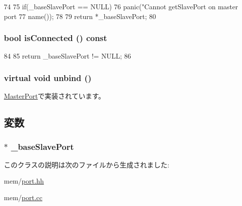\begin{DoxyCode}
74 {
75     if(_baseSlavePort == NULL)
76         panic("Cannot getSlavePort on master port %
77               name());
78 
79     return *_baseSlavePort;
80 }
\end{DoxyCode}
\hypertarget{classBaseMasterPort_a180fa55a4bf36580963bed9e3e09c227}{
\subsubsection[{isConnected}]{\setlength{\rightskip}{0pt plus 5cm}bool isConnected () const}}
\label{classBaseMasterPort_a180fa55a4bf36580963bed9e3e09c227}



\begin{DoxyCode}
84 {
85     return _baseSlavePort != NULL;
86 }
\end{DoxyCode}
\hypertarget{classBaseMasterPort_a406c5430a4a46c0068050632b9d3e765}{
\subsubsection[{unbind}]{\setlength{\rightskip}{0pt plus 5cm}virtual void unbind ()}}
\label{classBaseMasterPort_a406c5430a4a46c0068050632b9d3e765}


\hyperlink{classMasterPort_af294915156f1e30f1d2e574dccc87945}{MasterPort}で実装されています。

\subsection{変数}
\hypertarget{classBaseMasterPort_a5b9273661ccc0128fc9505529741c91d}{
\subsubsection[{\_\-baseSlavePort}]{$\ast$ {\bf \_\-baseSlavePort}}}
\label{classBaseMasterPort_a5b9273661ccc0128fc9505529741c91d}


このクラスの説明は次のファイルから生成されました:\begin{DoxyCompactItemize}
\item 
mem/\hyperlink{port_8hh}{port.hh}\item 
mem/\hyperlink{port_8cc}{port.cc}\end{DoxyCompactItemize}
